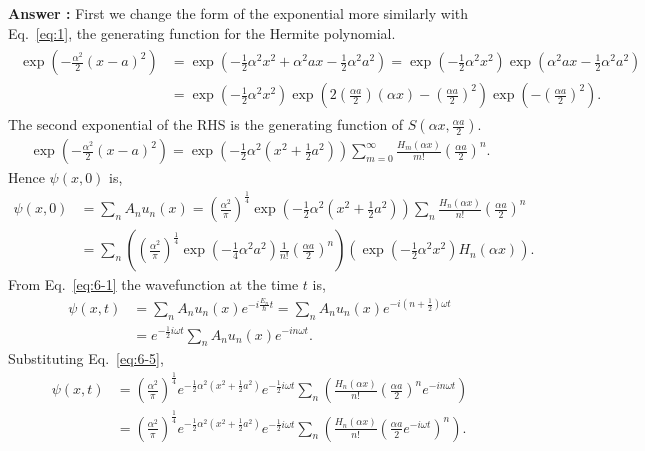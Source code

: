 \documentclass[floatfix,nofootinbib,superscriptaddress,fleqn]{revtex4-2}
\begin{document}
\noindent \textbf{Answer : }
First we change the form of the exponential more similarly with 
Eq.~\eqref{eq:1},
the generating function for the Hermite polynomial.
\begin{align}
  \begin{split}\label{eq:6-3}
    \exp{\left(-\frac{\alpha^2}{2}(x-a)^2\right)}
    &= \exp{\left(-\frac{1}{2}\alpha^2x^2+\alpha^2 ax
    -\frac{1}{2}\alpha^2a^2\right)}
    =\exp{\left(-\frac{1}{2}\alpha^2x^2\right)
    \exp\left(\alpha^2 ax-\frac{1}{2}\alpha^2a^2\right)}  \\
    &= \exp{\left(-\frac{1}{2}\alpha^2x^2\right)
    \exp\left(2\left(\frac{\alpha a}{2}\right)(\alpha x)
    -\left(\frac{\alpha a}{2}\right)^2\right)}
    \exp \left(-\left(\frac{\alpha a}{2}\right)^2\right).
  \end{split}
\end{align}
The second exponential of the RHS is the generating function of
$S\left(\alpha x, \frac{\alpha a}{2}\right)$.
\begin{align*}%
  \exp{\left(-\frac{\alpha^2}{2}(x-a)^2\right)}
  =\exp{\left(-\frac{1}{2}\alpha^2\left(x^2+\frac{1}{2}a^2\right)
  \right)}
  \sum_{m=0}^{\infty}\frac{H_m(\alpha x)}{m!}\left(\frac{\alpha a}{2}
  \right)^n.
\end{align*}
Hence $\psi(x,0)$ is,
\begin{align}\label{eq:6-5}
    \psi(x,0) &= \sum_n A_n u_n(x) =
    \left(\frac{\alpha^2}{\pi}\right)^{\frac{1}{4}}
    \exp{\left(-\frac{1}{2}\alpha^2\left(x^2+\frac{1}{2}a^2\right)
    \right)}
    \sum_n\frac{H_n(\alpha x)}{n!}\left(\frac{\alpha a}{2}
    \right)^n \\
    \label{eq:6-5-1}  &=\sum_n
    \left(\left(\frac{\alpha^2}{\pi}\right)^{\frac{1}{4}}
    \exp{\left(-\frac{1}{4}\alpha^2a^2\right)}
    \frac{1}{n!}\left(\frac{\alpha a}{2}\right)^n\right)
    \left(\exp{\left(-\frac{1}{2}\alpha^2x^2\right)}
    H_n(\alpha x)\right).
\end{align}
From Eq.~\eqref{eq:6-1} the wavefunction at the time $t$ is,
\begin{align*}
    \psi(x,t) &= \sum_n A_nu_n(x)e^{-i\frac{E_n}{\hbar}t}
    =\sum_n A_nu_n(x)e^{-i\left(n+\frac{1}{2}\right)\omega t}  \\
    &=e^{-\frac{1}{2}i\omega t}
    \sum_n A_nu_n(x)e^{-in\omega t}.
\end{align*}
Substituting Eq.~\eqref{eq:6-5},
\begin{align*}
    \psi(x,t) &=
    \left(\frac{\alpha^2}{\pi}\right)^{\frac{1}{4}}
    e^{-\frac{1}{2}\alpha^2\left(x^2+\frac{1}{2}a^2\right)}
    e^{-\frac{1}{2}i\omega t}
    \sum_n\left(\frac{H_n(\alpha x)}{n!}
    \left(\frac{\alpha a}{2}\right)^n
    e^{-in\omega t} \right) \\
    &=\left(\frac{\alpha^2}{\pi}\right)^{\frac{1}{4}}
    e^{-\frac{1}{2}\alpha^2\left(x^2+\frac{1}{2}a^2\right)}
    e^{-\frac{1}{2}i\omega t}
    \sum_n\left(\frac{H_n(\alpha x)}{n!}
    \left(\frac{\alpha a}{2}e^{-i\omega t} \right)^n
    \right).
\end{align*}
\end{document}
